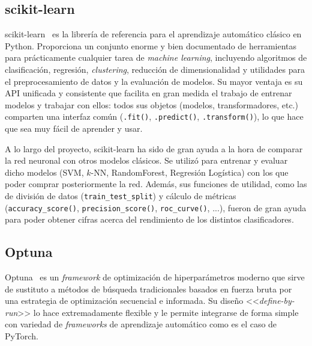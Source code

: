 \subsection{scikit-learn}


scikit-learn~\cite{scikitlearnUserGuide} es la librería de referencia para el aprendizaje automático clásico en Python. Proporciona un conjunto enorme y bien documentado de herramientas para prácticamente cualquier tarea de \textit{machine learning}, incluyendo algoritmos de clasificación, regresión, \textit{clustering}, reducción de dimensionalidad y utilidades para el preprocesamiento de datos y la evaluación de modelos. Su mayor ventaja es su API unificada y consistente que facilita en gran medida el trabajo de entrenar modelos y trabajar con ellos: todos sus objetos (modelos, transformadores, etc.) comparten una interfaz común (\texttt{.fit()}, \texttt{.predict()}, \texttt{.transform()}), lo que hace que sea muy fácil de aprender y usar.

A lo largo del proyecto, scikit-learn ha sido de gran ayuda a la hora de comparar la red neuronal con otros modelos clásicos. Se utilizó para entrenar y evaluar dicho modelos (SVM, $k$-NN, RandomForest, Regresión Logística) con los que poder comprar posteriormente la red. Además, sus funciones de utilidad, como las de división de datos (\texttt{train\_test\_split}) y cálculo de métricas (\texttt{accuracy\_score()}, \texttt{precision\_score()}, \texttt{roc\_curve()}, ...), fueron de gran ayuda para poder obtener cifras acerca del rendimiento de los distintos clasificadores.

\subsection{Optuna}

Optuna~\cite{optuna_2019} es un \textit{framework} de optimización de hiperparámetros moderno que sirve de sustituto a métodos de búsqueda tradicionales basados en fuerza bruta por una estrategia de optimización secuencial e informada. Su diseño <<\textit{define-by-run}>> lo hace extremadamente flexible y le permite integrarse de forma simple con variedad de \textit{frameworks} de aprendizaje automático como es el caso de PyTorch.

